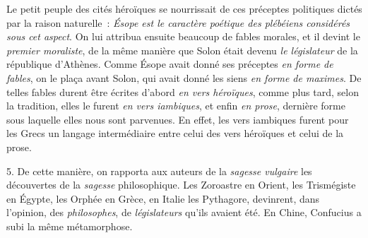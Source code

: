 \documentclass[french,twoside]{book} %
\begin{document}
Le petit peuple des cités héroïques se nourrissait  de ces préceptes politiques dictés par la raison naturelle : {\itshape Ésope est le caractère poétique des plébéiens considérés sous cet aspect}. On lui attribua ensuite beaucoup de fables morales, et il devint le {\itshape premier moraliste}, de la même manière que Solon était devenu {\itshape le législateur} de la république d’Athènes. Comme Ésope avait donné ses préceptes {\itshape en forme de fables}, on le plaça avant Solon, qui avait donné les siens {\itshape en forme de maximes}. De telles fables durent être écrites d’abord {\itshape en vers héroïques}, comme plus tard, selon la tradition, elles le furent {\itshape en vers iambiques}, et enfin {\itshape en prose}, dernière forme sous laquelle elles nous sont parvenues. En effet, les vers iambiques furent pour les Grecs un langage intermédiaire entre celui des vers héroïques et celui de la prose.\par
5. De cette manière, on rapporta aux auteurs de la {\itshape sagesse vulgaire} les découvertes de la {\itshape sagesse} philosophique. Les Zoroastre en Orient, les Trismégiste en Égypte, les Orphée en Grèce, en Italie les Pythagore, devinrent, dans l’opinion, des {\itshape philosophes}, de {\itshape législateurs} qu’ils avaient été. En Chine, Confucius a subi la même métamorphose.
\end{document}
